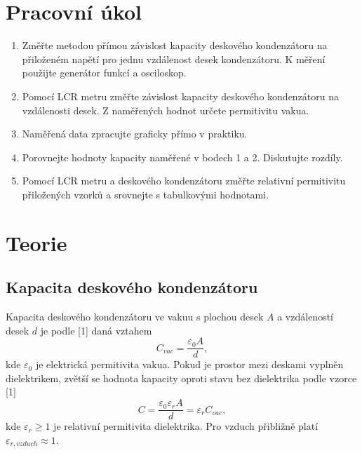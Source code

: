 \documentclass{../concepts/prepareprotokol} %
\begin{document}
\maketitle

\section{Pracovní úkol}
\begin{enumerate}
    \item Změřte metodou přímou závislost kapacity deskového kondenzátoru na přiloženém napětí pro jednu vzdálenost desek kondenzátoru. K měření použijte generátor funkcí a osciloskop.
    \item Pomocí LCR metru změřte závislost kapacity deskového kondenzátoru na vzdálenosti desek. Z naměřených hodnot určete permitivitu vakua.
    \item Naměřená data zpracujte graficky přímo v praktiku.
    \item Porovnejte hodnoty kapacity naměřené v bodech 1 a 2. Diskutujte rozdíly.
    \item Pomocí LCR metru a deskového kondenzátoru změřte relativní permitivitu přiložených vzorků a srovnejte s tabulkovými hodnotami.
\end{enumerate}

\section{Teorie}
\subsection{Kapacita deskového kondenzátoru}

Kapacita deskového kondenzátoru ve vakuu s plochou desek $A$ a vzdáleností desek $d$ je podle [1] daná vztahem
\begin{equation} \label{eq:cdesky}
    C_{vac} = \frac{\varepsilon_0 A}{d} ,
\end{equation}
kde $\varepsilon_0$ je elektrická permitivita vakua. Pokud je prostor mezi deskami vyplněn dielektrikem, zvětší se hodnota kapacity oproti stavu bez dielektrika podle vzorce [1]
\begin{equation} \label{eq:cdielektrikum}
    C = \frac{\varepsilon_0 \varepsilon_r A}{d} = \varepsilon_r C_{vac},
\end{equation}
kde $\varepsilon_r \geq 1$ je relativní permitivita dielektrika. Pro vzduch přibližně platí $\varepsilon_{r, vzduch} \approx 1$.
\end{document}

